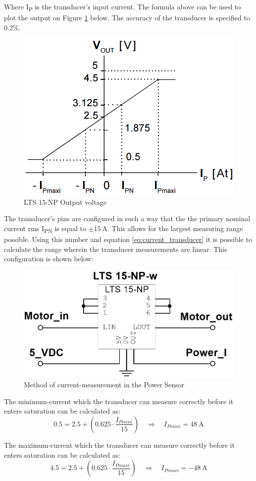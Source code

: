Where I\textsubscript{P} is the transducer's input current. The formula above can be used to plot the output on Figure \ref{fig:LTS_output} below. The accuracy of the transducer is specified to 0.2\%.

\begin{figure}[H]
	\centering
	\includegraphics[width=0.4\linewidth]{Hardware/Pictures/LTS_output}
	\caption{LTS 15-NP Output voltage}
	\label{fig:LTS_output}
\end{figure}

The transducer's pins are configured in such a way that the the primary nominal current rms I\textsubscript{PN} is equal to $\pm \SI{15}{\ampere}$. This allows for the largest measuring range possible. Using this number and equation \ref{eq:current_transducer} it is possible to calculate the range wherein the transducer measurements are linear. This configuration is shown below:

\begin{figure}[H]
	\centering
	\includegraphics[width=0.6\linewidth]{Hardware/Pictures/PowerSensor_Current}
	\caption{Method of current-measurement in the Power Sensor}
	\label{fig:PowerSensorCurrent}
\end{figure}

The minimum-current which the transducer can measure correctly before it enters saturation can be calculated as:
\begin{equation}
	0.5 = 2.5 + \left( 0.625 \cdot \frac{I_{Pmini}}{15} \right) \quad \Rightarrow \quad I_{Pmini} = \SI{48}{\ampere}
\end{equation}

The maximum-current which the transducer can measure correctly before it enters saturation can be calculated as:
\begin{equation}
	4.5 = 2.5 + \left( 0.625 \cdot \frac{I_{Pmaxi}}{15} \right) \quad \Rightarrow \quad I_{Pmaxi} = \SI{-48}{\ampere}
\end{equation}

